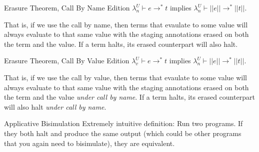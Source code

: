 \documentclass{beamer}
\begin{document}

\begin{frame}{Erasure Theorem, Call By Name Edition}
$\lambda _n ^U \vdash e \rightarrow ^* t$ implies $\lambda _n ^U \vdash ||e|| \rightarrow ^* ||t||$.\\
\vspace{1cm} 

That is, if we use the call by name, then terms that evaulate to some
value will always evaluate to that same value with the staging
annotations erased on both the term and the value. If a term halts,
its erased counterpart will also halt.
\end{frame}

\begin{frame}{Erasure Theorem, Call By Value Edition}
$\lambda _v ^U \vdash e \rightarrow ^* t$ implies $\lambda _n ^U \vdash ||e|| \rightarrow ^* ||t||$.\\
\vspace{1cm}

That is, if we use the call by value, then terms that evaulate to some
value will always evaluate to that same value with the staging
annotations erased on both the term and the value \textit{under call
  by name}. If a term halts, its erased counterpart will also halt
\textit{under call by name}.
\end{frame}



\begin{frame}{Applicative Bisimulation}
Extremely intuitive definition: Run two programs. If they both halt
and produce the same output (which could be other programs that you
again need to bisimulate), they are equivalent.
\end{frame}
\end{document}
